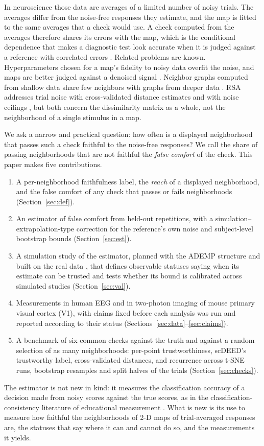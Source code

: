\documentclass[11pt]{article}
\begin{document}
In neuroscience those data are averages of a limited number of noisy trials.
The averages differ from the noise-free responses they estimate, and the map is fitted to the same averages that a check would use.
A check computed from the averages therefore shares its errors with the map, which is the conditional dependence that makes a diagnostic test look accurate when it is judged against a reference with correlated errors \citep{vacek1985}.
Related problems are known.
Hyperparameters chosen for a map's fidelity to noisy data overfit the noise, and maps are better judged against a denoised signal \citep{lin2024}.
Neighbor graphs computed from shallow data share few neighbors with graphs from deeper data \citep{ahlmann2023}.
RSA addresses trial noise with cross-validated distance estimates \citep{walther2016,guggenmos2018} and with noise ceilings \citep{nili2014,schutt2023}, but both concern the dissimilarity matrix as a whole, not the neighborhood of a single stimulus in a map.

We ask a narrow and practical question: how often is a displayed neighborhood that passes such a check faithful to the noise-free responses?
We call the share of passing neighborhoods that are not faithful the \emph{false comfort} of the check.
This paper makes five contributions.
\begin{enumerate}[leftmargin=*]
  \item A per-neighborhood faithfulness label, the \emph{reach} of a displayed neighborhood, and the false comfort of any check that passes or fails neighborhoods (Section~\ref{sec:def}).
  \item An estimator of false comfort from held-out repetitions, with a simulation--extrapolation-type correction for the reference's own noise \citep{cook1994,devanarayan2002} and subject-level bootstrap bounds (Section~\ref{sec:est}).
  \item A simulation study of the estimator, planned with the ADEMP structure \citep{morris2019} and built on the real data \citep{vaughan2009,schreck2024}, that defines observable statuses saying when its estimate can be trusted and tests whether its bound is calibrated across simulated studies (Section~\ref{sec:val}).
  \item Measurements in human EEG and in two-photon imaging of mouse primary visual cortex (V1), with claims fixed before each analysis was run and reported according to their status (Sections~\ref{sec:data}--\ref{sec:claims}).
  \item A benchmark of six common checks against the truth and against a random selection of as many neighborhoods: per-point trustworthiness, scDEED's trustworthy label, cross-validated distances, and recurrence across t-SNE runs, bootstrap resamples and split halves of the trials (Section~\ref{sec:checks}).
\end{enumerate}
The estimator is not new in kind: it measures the classification accuracy of a decision made from noisy scores against the true scores, as in the classification-consistency literature of educational measurement \citep{livingston1995}.
What is new is its use to measure how faithful the neighborhoods of 2-D maps of trial-averaged responses are, the statuses that say where it can and cannot do so, and the measurements it yields.
\end{document}
